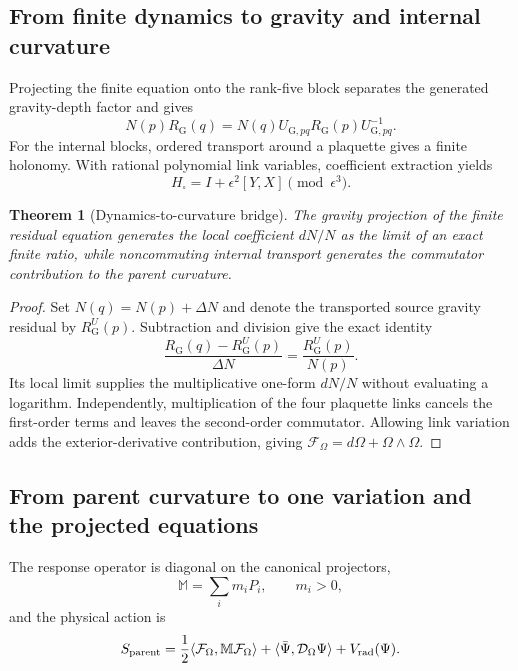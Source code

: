 \documentclass[11pt]{article}
\numberwithin{equation}{section}
\newtheorem{theorem}[definition]{Theorem}
\theoremstyle{remark}
\begin{document}
\subsection{From finite dynamics to gravity and internal curvature}
Projecting the finite equation onto the rank-five block separates the generated gravity-depth factor and gives
\begin{equation}
N(p)R_{\mathrm G}(q)=N(q)U_{\mathrm G,pq}R_{\mathrm G}(p)U_{\mathrm G,pq}^{-1}.
\end{equation}
For the internal blocks, ordered transport around a plaquette gives a finite holonomy. With rational polynomial link variables, coefficient extraction yields
\begin{equation}
H_{\square}=I+\epsilon^2[Y,X]\pmod{\epsilon^3}.
\end{equation}

\begin{theorem}[Dynamics-to-curvature bridge]
The gravity projection of the finite residual equation generates the local coefficient $dN/N$ as the limit of an exact finite ratio, while noncommuting internal transport generates the commutator contribution to the parent curvature.
\end{theorem}
\begin{proof}
Set $N(q)=N(p)+\Delta N$ and denote the transported source gravity residual by $R_{\mathrm G}^{U}(p)$. Subtraction and division give the exact identity
\begin{equation}
\frac{R_{\mathrm G}(q)-R_{\mathrm G}^{U}(p)}{\Delta N}
=\frac{R_{\mathrm G}^{U}(p)}{N(p)}.
\end{equation}
Its local limit supplies the multiplicative one-form $dN/N$ without evaluating a logarithm. Independently, multiplication of the four plaquette links cancels the first-order terms and leaves the second-order commutator. Allowing link variation adds the exterior-derivative contribution, giving $\mathcal F_\Omega=d\Omega+\Omega\wedge\Omega$.
\end{proof}

\subsection{From parent curvature to one variation and the projected equations}
The response operator is diagonal on the canonical projectors,
\begin{equation}
\mathbb M=\sum_i m_iP_i,\qquad m_i>0,
\end{equation}
and the physical action is
\begin{equation}
S_{\rm parent}=\frac12\langle\mathcal F_\Omega,\mathbb M\mathcal F_\Omega\rangle
+\langle\bar\Psi,\mathcal D_\Omega\Psi\rangle+V_{\rm rad}(\Psi).
\end{equation}
\end{document}
